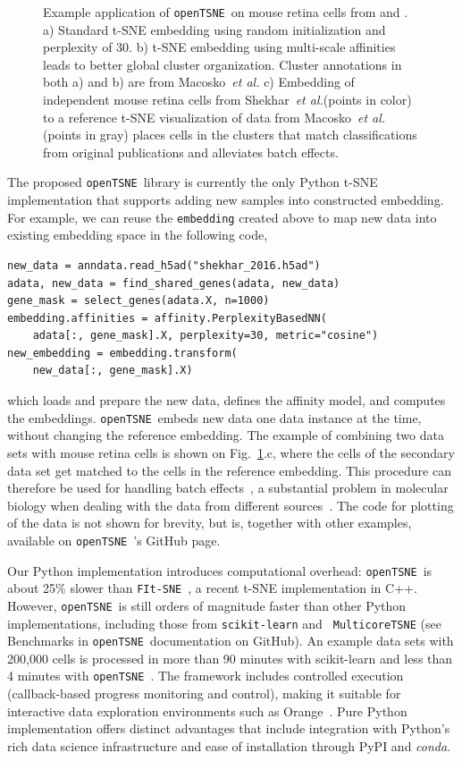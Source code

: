 \documentclass{bioinfo}
\def\etal{{\em et al.}\xspace}
\newcommand{\opentsne}[0]{{\tt openTSNE}\ }
\begin{document}
\begin{figure}[htbp]
\caption{Example application of \opentsne on mouse retina cells from
\citet{Macosko2015} and \citet{Shekhar2016}. a) Standard t-SNE embedding using
random initialization and perplexity of 30. b) t-SNE embedding using
multi-scale affinities leads to better global cluster organization. Cluster
annotations in both a) and b) are from Macosko~\etal c) Embedding of independent mouse retina cells from
Shekhar~\etal (points in color) to a reference t-SNE visualization of data from
Macosko~\etal (points in gray) places cells in the clusters that match
classifications from original publications and alleviates batch effects.}
\label{fig:tsne}
\end{figure}

The proposed \opentsne library is currently the only Python t\nobreakdash -SNE
implementation that supports adding new samples into constructed embedding. For
example, we can reuse the {\tt embedding} created above to map new data into
existing embedding space in the following code,

\begin{lstlisting}
new_data = anndata.read_h5ad("shekhar_2016.h5ad")
adata, new_data = find_shared_genes(adata, new_data)
gene_mask = select_genes(adata.X, n=1000)
embedding.affinities = affinity.PerplexityBasedNN(
	adata[:, gene_mask].X, perplexity=30, metric="cosine")
new_embedding = embedding.transform(
	new_data[:, gene_mask].X)
\end{lstlisting}

\noindent which loads and prepare the new data, defines the affinity model, and
computes the embeddings. \opentsne embeds new data one data instance at the
time, without changing the reference embedding. The example of combining two
data sets with mouse retina cells is shown on Fig.~\ref{fig:tsne}.c, where the
cells of the secondary data set get matched to the cells in the reference
embedding. This
procedure can therefore be used for handling batch effects~\citep{polivcar2019embedding}, a substantial
problem in molecular biology when dealing with the data from different
sources~\citep{batch_effect_causes}. The code for plotting of the data is not shown
for brevity, but is, together with other examples, available on {\opentsne}'s
GitHub page. 

Our Python implementation introduces computational overhead: \opentsne is about
25\% slower than {\tt FIt-SNE}~\citep{fi_tsne}, a recent t-SNE implementation
in C++. However, \opentsne is still orders of magnitude faster than other
Python implementations, including those from {\tt scikit-learn} and {\tt
MulticoreTSNE} (see Benchmarks in \opentsne documentation on GitHub). An example data sets with 200,000 cells
is processed in more than 90 minutes with scikit-learn and less than 4 minutes with \opentsne.
The framework includes controlled execution (callback-based progress monitoring and
control), making it suitable for interactive data exploration environments such
as Orange~\citep{scorange}. Pure Python implementation offers distinct
advantages that include integration with Python's rich data science
infrastructure and ease of installation through PyPI and {\em conda}.
\end{document}
